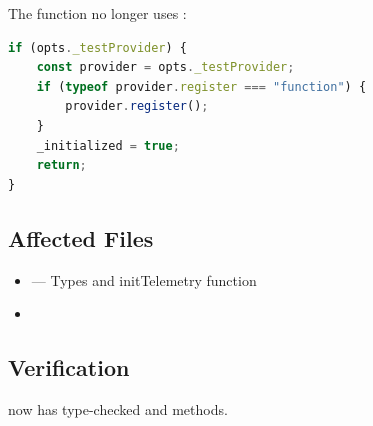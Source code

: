 The  function no longer uses :

\begin{lstlisting}[language=TypeScript]
if (opts._testProvider) {
    const provider = opts._testProvider;
    if (typeof provider.register === "function") {
        provider.register();
    }
    _initialized = true;
    return;
}
\end{lstlisting}

\subsection*{Affected Files}
\begin{itemize}
    \item {} — Types and initTelemetry function
    \item {}
\end{itemize}

\subsection*{Verification}
 now has type-checked  and  methods.
